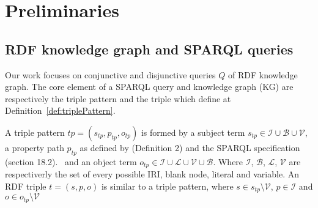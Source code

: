 \section{Preliminaries}






\subsection{RDF knowledge graph and SPARQL queries}
Our work focuses on conjunctive and disjunctive queries $Q$ of RDF knowledge graph.
The core element of a SPARQL query and knowledge graph (KG) are respectively the triple pattern and the triple which define at Definition~\ref{def:triplePattern}.

\begin{definition}\label{def:triplePattern}
    A triple pattern $tp = (s_{tp}, p_{tp} , o_{tp})$ is formed by a subject term $s_{tp} \in \mathcal{I} \cup \mathcal{B} \cup \mathcal{V}$, 
    a property path  $p_{tp}$ as defined by  \citeauthor{Kostylev2015} (Definition 2) and the SPARQL specification (section 18.2).~ 
    and an object term  $o_{tp} \in \mathcal{I} \cup \mathcal{L} \cup \mathcal{V} \cup \mathcal{B}$.
    Where $\mathcal{I}$, $\mathcal{B}$, $\mathcal{L}$, $\mathcal{V}$ are respectiverly the set of every possible IRI, blank node, literal and variable.
    An RDF triple $t = (s,p,o)$ is similar to a triple pattern, 
    where $s \in s_{tp} \setminus \mathcal{V}$,
    $p \in \mathcal{I}$ and $o \in o_{tp} \setminus \mathcal{V}$
\end{definition}

